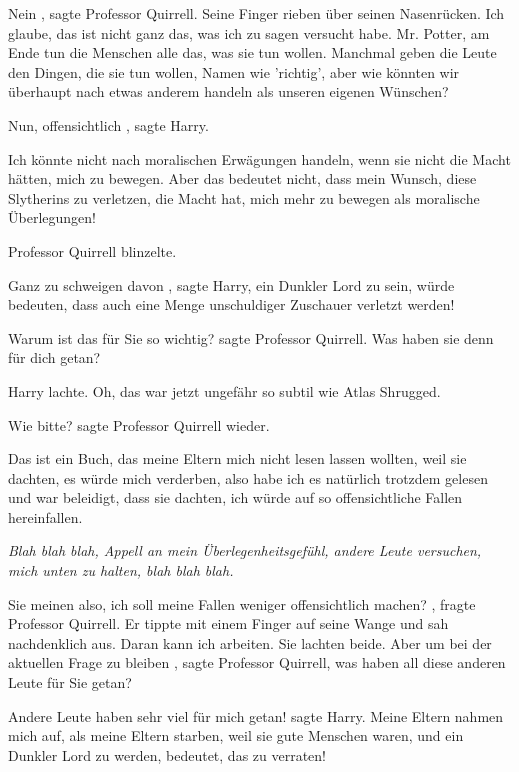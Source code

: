 \glqq Nein\grqq{} , sagte Professor Quirrell. Seine Finger rieben über seinen
Nasenrücken. \glqq Ich glaube, das ist nicht ganz das, was ich zu sagen versucht
habe. Mr. Potter, am Ende tun die Menschen alle das, was sie tun wollen.
Manchmal geben die Leute den Dingen, die sie tun wollen, Namen wie 'richtig',
aber wie könnten wir überhaupt nach etwas anderem handeln als unseren eigenen
Wünschen?\grqq{}

\glqq Nun, offensichtlich\grqq{} , sagte Harry.

\glqq Ich könnte nicht nach moralischen Erwägungen handeln, wenn sie nicht die
Macht hätten, mich zu bewegen. Aber das bedeutet nicht, dass mein Wunsch, diese
Slytherins zu verletzen, die Macht hat, mich mehr zu bewegen als moralische
Überlegungen!\grqq{}

Professor Quirrell blinzelte.

\glqq Ganz zu schweigen davon\grqq{} , sagte Harry, \glqq ein Dunkler Lord zu
sein, würde bedeuten, dass auch eine Menge unschuldiger Zuschauer verletzt
werden!\grqq{}

\glqq Warum ist das für Sie so wichtig?\grqq{} sagte Professor Quirrell. \glqq
Was haben sie denn für dich getan?\grqq{}

Harry lachte. \glqq Oh, das war jetzt ungefähr so subtil wie Atlas
Shrugged.\grqq{}

\glqq Wie bitte?\grqq{} sagte Professor Quirrell wieder.

\glqq Das ist ein Buch, das meine Eltern mich nicht lesen lassen wollten, weil
sie dachten, es würde mich verderben, also habe ich es natürlich trotzdem
gelesen und war beleidigt, dass sie dachten, ich würde auf so offensichtliche
Fallen hereinfallen.

\emph{Blah blah blah, Appell an mein Überlegenheitsgefühl, andere Leute
versuchen, mich unten zu halten, blah blah blah.\grqq{} }

\glqq Sie meinen also, ich soll meine Fallen weniger offensichtlich
machen?\grqq{} , fragte Professor Quirrell. Er tippte mit einem Finger auf seine
Wange und sah nachdenklich aus. \glqq Daran kann ich arbeiten.\grqq{} Sie
lachten beide. \glqq Aber um bei der aktuellen Frage zu bleiben\grqq{} , sagte
Professor Quirrell, \glqq was haben all diese anderen Leute für Sie
getan?\grqq{}

\glqq Andere Leute haben sehr viel für mich getan!\grqq{} sagte Harry. \glqq
Meine Eltern nahmen mich auf, als meine Eltern starben, weil sie gute Menschen
waren, und ein Dunkler Lord zu werden, bedeutet, das zu verraten!\grqq{}

